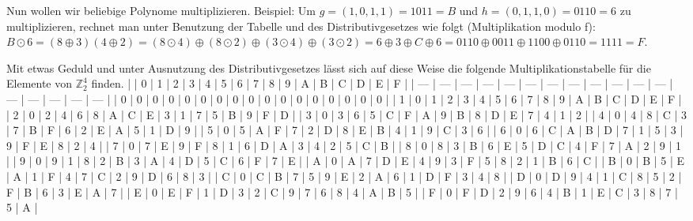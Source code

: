 \documentclass[a4paper]{article}
\begin{document}
\begin{multicols}{3}
    Nun wollen wir beliebige Polynome multiplizieren. Beispiel: Um $g=(1,0,1,1)=1011=B$ und $h=(0,1,1,0)=0110=6$ zu multiplizieren, rechnet man unter Benutzung der Tabelle und des Distributivgesetzes wie folgt (Multiplikation modulo f):
    $B\odot 6=(8\oplus 3)(4\oplus 2)=(8\odot 4)\oplus(8\odot 2)\oplus(3\odot 4)\oplus(3\odot 2)=6\oplus 3\oplus C\oplus 6= 0110\oplus 0011 \oplus 1100 \oplus 0110 = 1111 = F$.

    Mit etwas Geduld und unter Ausnutzung des Distributivgesetzes lässt sich auf diese Weise die folgende Multiplikationstabelle für die Elemente von $\mathbb{Z}^4_2$ finden.
    |     | 0   | 1   | 2   | 3   | 4   | 5   | 6   | 7   | 8   | 9   | A   | B   | C   | D   | E   | F   |
    | --- | --- | --- | --- | --- | --- | --- | --- | --- | --- | --- | --- | --- | --- | --- | --- | --- |
    | 0   | 0   | 0   | 0   | 0   | 0   | 0   | 0   | 0   | 0   | 0   | 0   | 0   | 0   | 0   | 0   | 0   |
    | 1   | 0   | 1   | 2   | 3   | 4   | 5   | 6   | 7   | 8   | 9   | A   | B   | C   | D   | E   | F   |
    | 2   | 0   | 2   | 4   | 6   | 8   | A   | C   | E   | 3   | 1   | 7   | 5   | B   | 9   | F   | D   |
    | 3   | 0   | 3   | 6   | 5   | C   | F   | A   | 9   | B   | 8   | D   | E   | 7   | 4   | 1   | 2   |
    | 4   | 0   | 4   | 8   | C   | 3   | 7   | B   | F   | 6   | 2   | E   | A   | 5   | 1   | D   | 9   |
    | 5   | 0   | 5   | A   | F   | 7   | 2   | D   | 8   | E   | B   | 4   | 1   | 9   | C   | 3   | 6   |
    | 6   | 0   | 6   | C   | A   | B   | D   | 7   | 1   | 5   | 3   | 9   | F   | E   | 8   | 2   | 4   |
    | 7   | 0   | 7   | E   | 9   | F   | 8   | 1   | 6   | D   | A   | 3   | 4   | 2   | 5   | C   | B   |
    | 8   | 0   | 8   | 3   | B   | 6   | E   | 5   | D   | C   | 4   | F   | 7   | A   | 2   | 9   | 1   |
    | 9   | 0   | 9   | 1   | 8   | 2   | B   | 3   | A   | 4   | D   | 5   | C   | 6   | F   | 7   | E   |
    | A   | 0   | A   | 7   | D   | E   | 4   | 9   | 3   | F   | 5   | 8   | 2   | 1   | B   | 6   | C   |
    | B   | 0   | B   | 5   | E   | A   | 1   | F   | 4   | 7   | C   | 2   | 9   | D   | 6   | 8   | 3   |
    | C   | 0   | C   | B   | 7   | 5   | 9   | E   | 2   | A   | 6   | 1   | D   | F   | 3   | 4   | 8   |
    | D   | 0   | D   | 9   | 4   | 1   | C   | 8   | 5   | 2   | F   | B   | 6   | 3   | E   | A   | 7   |
    | E   | 0   | E   | F   | 1   | D   | 3   | 2   | C   | 9   | 7   | 6   | 8   | 4   | A   | B   | 5   |
    | F   | 0   | F   | D   | 2   | 9   | 6   | 4   | B   | 1   | E   | C   | 3   | 8   | 7   | 5   | A   |


\end{multicols}
\end{document}
